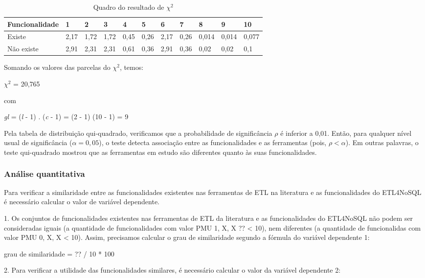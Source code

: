 \begin{table}
	\centering
	\caption{Quadro do resultado de $ \chi^2 $}
	\label{chiquadrado}
	\begin{tabular}{|l|l|l|l|l|l|l|l|l|l|l|}
		\hline
		Funcionalidade & 1 & 2 & 3 & 4 & 5 & 6 & 7 & 8 & 9 & 10 \\ \hline
		Existe & 2,17 & 1,72 & 1,72 & 0,45 & 0,26 & 2,17 & 0,26 & 0,014 & 0,014 & 0,077  \\ \hline
		Não existe & 2,91 & 2,31 & 2,31 & 0,61 & 0,36 & 2,91 & 0,36 & 0,02 & 0,02 & 0,1 \\ \hline
	\end{tabular}
\end{table}

Somando os valores das parcelas do  $ \chi^2 $, temos: 

$ \chi^2 $ = 20,765

com

\textit{gl} = (\textit{l} - 1) . (\textit{c} - 1) = (2 - 1) (10 - 1) = 9

Pela tabela de distribuição qui-quadrado, verificamos que a probabilidade de significância $\rho$ é inferior a 0,01. Então, para qualquer nível usual de significância ($\alpha = 0,05$), o teste detecta associação entre as funcionalidades e as ferramentas (pois, $\rho < \alpha $). Em outras palavras, o teste qui-quadrado mostrou que as ferramentas em estudo são diferentes quanto às suas funcionalidades.

\subsubsection{Análise quantitativa}

Para verificar a similaridade entre as funcionalidades existentes nas ferramentas de ETL na literatura e as funcionalidades do ETL4NoSQL é necessário calcular o valor de variável dependente.

1. Os conjuntos de funcionalidades existentes nas ferramentas de ETL da literatura e as funcionalidades do ETL4NoSQL não podem ser consideradas iguais (a quantidade de funcionalidades com valor PMU {1, X, X} ?? < 10), nem diferentes (a quantidade de funcionalidas com valor PMU {0, X, X} < 10). Assim, precisamos calcular o grau de similaridade segundo a fórmula do variável dependente 1:

grau de similaridade = ?? / 10 * 100%

2. Para verificar a utilidade das funcionalidades similares, é necessário calcular o valor da variável dependente 2:

